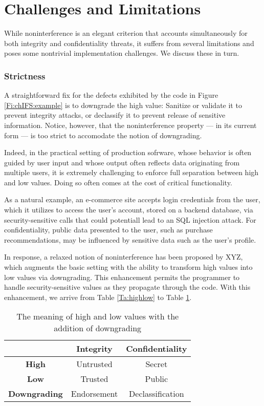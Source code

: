 \section{Challenges and Limitations}

While noninterference is an elegant criterion that accounts simultaneously for both integrity and confidentiality threats, it suffers from several limitations and poses some nontrivial implementation challenges. We discuss these in turn.

\subsubsection{Strictness}

A straightforward fix for the defects exhibited by the code in Figure \ref{Fi:chIFS:example} is to downgrade the high value: Sanitize or validate it to prevent integrity attacks, or declassify it to prevent release of sensitive information. Notice, however, that the noninterference property --- in its current form --- is too strict to accomodate the notion of downgrading.

Indeed, in the practical setting of production sofrware, 
whose behavior is often guided by user input and whose output often reflects data originating from multiple users, it is extremely challenging to enforce full separation between high and low values. Doing so often comes at the cost of critical functionality.

As a natural example, an e-commerce site accepts login credentials from the user, which it utilizes to access the user's account, stored on a backend database, via security-sensitive calls that could potentiall lead to an SQL injection attack. For confidentiality, public data presented to the user, such as purchase recommendations, may be influenced by sensitive data such as the user's profile.

In response, a relaxed notion of noninterference has been proposed by XYZ, which augments the basic setting with the ability to transform high values into low values via downgrading. This enhancement permits the programmer to handle security-sensitive values as they propagate through the code. With this enhancement, we arrive from Table \ref{Ta:highlow} to Table \ref{Ta:highlowExtended}.

\begin{table}
	\begin{center}
		\begin{tabular}{|c|c|c|}
			\hline
			& {\bf Integrity} & {\bf Confidentiality} \\ \hline
			{\bf High}	& Untrusted & Secret \\ \hline
			{\bf Low} & Trusted & Public \\ \hline		
			{\bf Downgrading} & Endorsement & Declassification \\
			\hline
		\end{tabular}
	\end{center}
	\caption{\label{Ta:highlowExtended}The meaning of high and low values with the addition of downgrading}
\end{table} 

